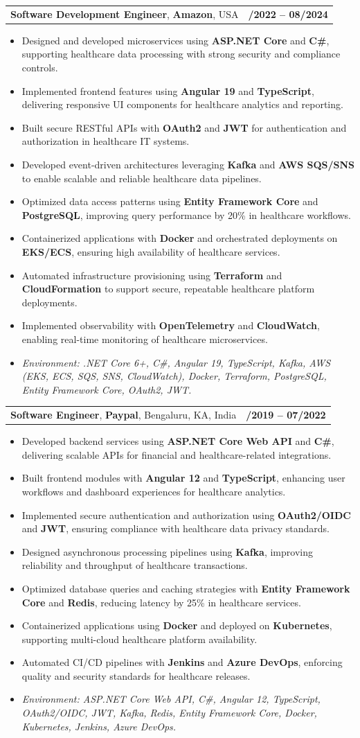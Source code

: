 \documentclass[letterpaper,11pt]{article}
\makeatletter
\newcommand{\resumeItem}[1]{
  \item\footnotesize{
    {#1 \vspace{-2pt}}
  }
}
\newcommand{\resumeSubheading}[4]{
  \vspace{-2pt}\item
    \begin{tabular*}{1.0\textwidth}[t]{l@{\extracolsep{\fill}}r}
      \textbf{\fontsize{10pt}{14pt}\selectfont #3}, \textbf{\fontsize{10pt}{14pt}\selectfont #1}, \fontsize{10pt}{14pt}\selectfont #4 & \textbf{\fontsize{10pt}{14pt}\selectfont #2} \\
    \end{tabular*}\vspace{-7pt}
}
\newcommand{\resumeItemListStart}{\begin{itemize}[leftmargin=*]}
\newcommand{\resumeItemListEnd}{\end{itemize}\vspace{-5pt}}
\makeatother
\begin{document}
\resumeSubheading
{Amazon}{10/2022 -- 08/2024}
{Software Development Engineer}{USA}
\resumeItemListStart
  \resumeItem{Designed and developed microservices using \textbf{ASP.NET Core} and \textbf{C\#}, supporting healthcare data processing with strong security and compliance controls.}
  \resumeItem{Implemented frontend features using \textbf{Angular 19} and \textbf{TypeScript}, delivering responsive UI components for healthcare analytics and reporting.}
  \resumeItem{Built secure RESTful APIs with \textbf{OAuth2} and \textbf{JWT} for authentication and authorization in healthcare IT systems.}
  \resumeItem{Developed event-driven architectures leveraging \textbf{Kafka} and \textbf{AWS SQS/SNS} to enable scalable and reliable healthcare data pipelines.}
  \resumeItem{Optimized data access patterns using \textbf{Entity Framework Core} and \textbf{PostgreSQL}, improving query performance by 20\% in healthcare workflows.}
  \resumeItem{Containerized applications with \textbf{Docker} and orchestrated deployments on \textbf{EKS/ECS}, ensuring high availability of healthcare services.}
  \resumeItem{Automated infrastructure provisioning using \textbf{Terraform} and \textbf{CloudFormation} to support secure, repeatable healthcare platform deployments.}
  \resumeItem{Implemented observability with \textbf{OpenTelemetry} and \textbf{CloudWatch}, enabling real-time monitoring of healthcare microservices.}
  \resumeItem{\textit{Environment: .NET Core 6+, C\#, Angular 19, TypeScript, Kafka, AWS (EKS, ECS, SQS, SNS, CloudWatch), Docker, Terraform, PostgreSQL, Entity Framework Core, OAuth2, JWT.}}
\resumeItemListEnd

\resumeSubheading
{Paypal}{08/2019 -- 07/2022}
{Software Engineer}{Bengaluru, KA, India}
\resumeItemListStart
  \resumeItem{Developed backend services using \textbf{ASP.NET Core Web API} and \textbf{C\#}, delivering scalable APIs for financial and healthcare-related integrations.}
  \resumeItem{Built frontend modules with \textbf{Angular 12} and \textbf{TypeScript}, enhancing user workflows and dashboard experiences for healthcare analytics.}
  \resumeItem{Implemented secure authentication and authorization using \textbf{OAuth2/OIDC} and \textbf{JWT}, ensuring compliance with healthcare data privacy standards.}
  \resumeItem{Designed asynchronous processing pipelines using \textbf{Kafka}, improving reliability and throughput of healthcare transactions.}
  \resumeItem{Optimized database queries and caching strategies with \textbf{Entity Framework Core} and \textbf{Redis}, reducing latency by 25\% in healthcare services.}
  \resumeItem{Containerized applications using \textbf{Docker} and deployed on \textbf{Kubernetes}, supporting multi-cloud healthcare platform availability.}
  \resumeItem{Automated CI/CD pipelines with \textbf{Jenkins} and \textbf{Azure DevOps}, enforcing quality and security standards for healthcare releases.}
  \resumeItem{\textit{Environment: ASP.NET Core Web API, C\#, Angular 12, TypeScript, OAuth2/OIDC, JWT, Kafka, Redis, Entity Framework Core, Docker, Kubernetes, Jenkins, Azure DevOps.}}
\resumeItemListEnd
\end{document}
